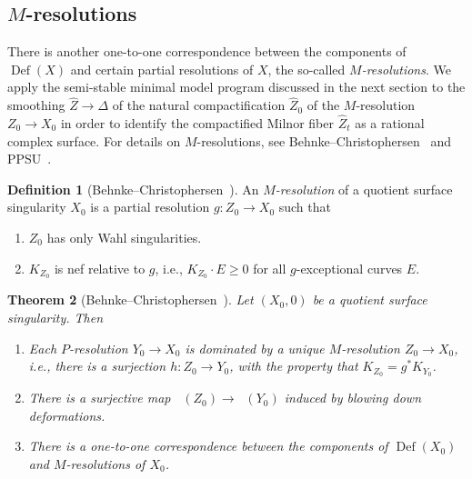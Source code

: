 \documentclass[reqno, twoside, a4paper]{amsart}
\newtheorem{theorem}{Theorem}[section]
\theoremstyle{definition}
\newtheorem{definition}[theorem]{Definition}
\numberwithin{equation}{section}
\DeclareMathOperator{\Def}{Def}
\DeclareMathOperator{\DefQG}{Def^{\mathrm{QG}}}
\begin{document}
\subsection{$M$-resolutions}

There is another one-to-one correspondence between the components of $\Def(X)$ and certain partial resolutions of $X$, the so-called \emph{$M$-resolutions}. We apply the semi-stable minimal model program discussed in the next section to the smoothing $\widehat{Z} \to \Delta$ of the natural compactification $\widehat{Z}_0$ of the $M$-resolution $Z_0 \to X_0$ in order to identify the compactified Milnor fiber $\widehat{Z}_t$ as a rational complex surface. For details on $M$-resolutions, see Behnke--Christophersen~\cite{Behnke-Christophersen-1994} and PPSU~\cite[\S 6.2]{PPSU-2015}.


\begin{definition}[{Behnke--Christophersen~\cite[p.882]{Behnke-Christophersen-1994}}]
\label{definition:M-resolution}
An \emph{$M$-resolution} of a quotient surface singularity $X_0$ is a partial resolution $g \colon Z_0 \to X_0$ such that
%
\begin{enumerate}
\item $Z_0$ has only Wahl singularities.

\item $K_{Z_0}$ is nef relative to $g$, i.e., $K_{Z_0} \cdot E \ge 0$ for all $g$-exceptional curves $E$.
\end{enumerate}
\end{definition}

\begin{theorem}[{Behnke--Christophersen~\cite[3.1.4, 3.3.2, 3.4]{Behnke-Christophersen-1994}}]
Let $(X_0,0)$ be a quotient surface singularity. Then

\begin{enumerate}
\item Each $P$-resolution $Y_0 \to X_0$ is dominated by a unique $M$-resolution $Z_0 \to X_0$, i.e., there is a surjection $h \colon Z_0 \to Y_0$, with the property that $K_{Z_0} = g^{\ast}{K_{Y_0}}$.

\item There is a surjective map $\DefQG(Z_0) \to \DefQG(Y_0)$ induced by blowing down deformations.

\item There is a one-to-one correspondence between the components of $\Def(X_0)$ and $M$-resolutions of $X_0$.
\end{enumerate}
\end{theorem}
\end{document}
